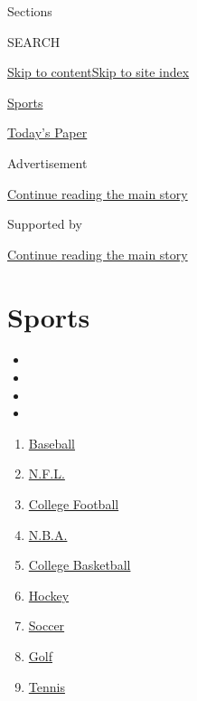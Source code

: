 Sections

SEARCH

\protect\hyperlink{site-content}{Skip to
content}\protect\hyperlink{site-index}{Skip to site index}

\href{https://www.nytimes.com/section/sports}{Sports}

\href{https://myaccount.nytimes.com/auth/login?response_type=cookie\&client_id=vi}{}

\href{https://www.nytimes.com/section/todayspaper}{Today's Paper}

Advertisement

\protect\hyperlink{after-top}{Continue reading the main story}

Supported by

\protect\hyperlink{after-sponsor}{Continue reading the main story}

\hypertarget{sports}{%
\section{Sports}\label{sports}}

\begin{itemize}
\item
\item
\item
\item
\end{itemize}

\begin{enumerate}
\def\labelenumi{\arabic{enumi}.}
\tightlist
\item
  \href{/section/sports/baseball}{Baseball}
\item
  \href{/section/sports/football}{N.F.L.}
\item
  \href{/section/sports/ncaafootball}{College Football}
\item
  \href{/section/sports/basketball}{N.B.A.}
\item
  \href{/section/sports/ncaabasketball}{College Basketball}
\item
  \href{/section/sports/hockey}{Hockey}
\item
  \href{/section/sports/soccer}{Soccer}
\item
  \href{/section/sports/golf}{Golf}
\item
  \href{/section/sports/tennis}{Tennis}
\end{enumerate}


